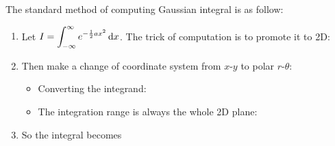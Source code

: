 \documentclass[class=article, crop=false, 12pt]{standalone}
\begin{document}
\begin{notation}
    The standard method of computing Gaussian integral is as follow:
    \begin{enumerate}
        \item Let $\displaystyle I = \int_{-\infty}^{\infty} e^{-\frac{1}{2} ax^2} \dd{x}$. 
        The trick of computation is to promote it to 2D:

        \item Then make a change of coordinate system from $x$-$y$ to polar $r$-$\theta$: 
        \begin{itemize}
            \item Converting the integrand:
            
            \item The integration range is always the whole 2D plane:
        \end{itemize}

        \item So the integral becomes 
            
    \end{enumerate}
\end{notation}
\end{document}
